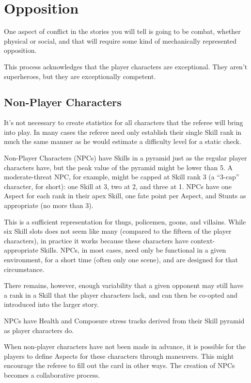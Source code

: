 \section{Opposition}\label{sec:opposition} %

One aspect of conflict in the stories you will tell is going to be combat, whether physical or social, and that will require some kind of mechanically represented opposition.

This process acknowledges that the player characters are exceptional. They aren't superheroes, but they are exceptionally competent.

\subsection{Non-Player Characters}\label{sec:Non-Player Characters} %

It's not necessary to create statistics for all characters that the referee will bring into play. In many cases the referee need only establish their single Skill rank in much the same manner as he would estimate a difficulty level for a static check.

Non-Player Characters (NPCs) have Skills in a pyramid just as the regular player characters have, but the peak value of the pyramid might be lower than 5. A moderate-threat NPC, for example, might be capped at Skill rank 3 (a ``3-cap'' character, for short): one Skill at 3, two at 2, and three at 1. NPCs have one Aspect for each rank in their apex Skill, one fate point per Aspect, and Stunts as appropriate (no more than 3).

This is a sufficient representation for thugs, policemen, goons, and villains. While six Skill slots does not seem like many (compared to the fifteen of the player characters), in practice it works because these characters have context-appropriate Skills. NPCs, in most cases, need only be functional in a given environment, for a short time (often only one scene), and are designed for that circumstance.

There remains, however, enough variability that a given opponent may still have a rank in a Skill that the player characters lack, and can then be co-opted and introduced into the larger story.

NPCs have Health and Composure stress tracks derived from their Skill pyramid as player characters do.

When non-player characters have not been made in advance, it is possible for the players to define Aspects for these characters through maneuvers.  This might encourage the referee to fill out the card in other ways.  The creation of NPCs becomes a collaborative process.

